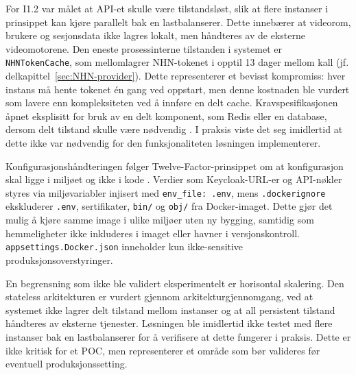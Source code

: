 For I1.2 var målet at API-et skulle være tilstandsløst, slik at flere instanser i prinsippet kan kjøre parallelt bak en lastbalanserer. Dette innebærer at videorom, brukere og sesjonsdata ikke lagres lokalt, men håndteres av de eksterne videomotorene. Den eneste prosessinterne tilstanden i systemet er \texttt{NHNTokenCache}, som mellomlagrer NHN-tokenet i opptil 13 dager mellom kall (jf. delkapittel~\ref{sec:NHN-provider}). Dette representerer et bevisst kompromiss: hver instans må hente tokenet én gang ved oppstart, men denne kostnaden ble vurdert som lavere enn kompleksiteten ved å innføre en delt cache. Kravspesifikasjonen åpnet eksplisitt for bruk av en delt komponent, som Redis eller en database, dersom delt tilstand skulle være nødvendig \cite{hdo_kravspec}. I praksis viste det seg imidlertid at dette ikke var nødvendig for den funksjonaliteten løsningen implementerer.

Konfigurasjonshåndteringen følger Twelve-Factor-prinsippet om at konfigurasjon skal ligge i miljøet og ikke i kode \cite{twelve_factor}. Verdier som Keycloak-URL-er og API-nøkler styres via miljøvariabler injisert med \texttt{env\_file: .env}, mens \texttt{.dockerignore} ekskluderer \texttt{.env}, sertifikater, \texttt{bin/} og \texttt{obj/} fra Docker-imaget. Dette gjør det mulig å kjøre samme image i ulike miljøer uten ny bygging, samtidig som hemmeligheter ikke inkluderes i imaget eller havner i versjonskontroll. \texttt{appsettings.Docker.json} inneholder kun ikke-sensitive produksjonsoverstyringer.

En begrensning som ikke ble validert eksperimentelt er horisontal skalering. Den stateless arkitekturen er vurdert gjennom arkitekturgjennomgang, ved at systemet ikke lagrer delt tilstand mellom instanser og at all persistent tilstand håndteres av eksterne tjenester. Løsningen ble imidlertid ikke testet med flere instanser bak en lastbalanserer for å verifisere at dette fungerer i praksis. Dette er ikke kritisk for et POC, men representerer et område som bør valideres før eventuell produksjonssetting.